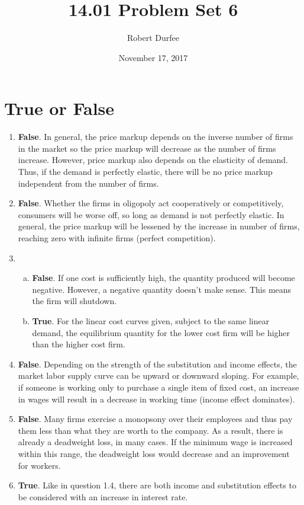 \documentclass{article}
\title{ 14.01 Problem Set 6 }
\author{ Robert Durfee }
\date{ November 17, 2017 }
\begin{document}
\maketitle

\section{ True or False }

\begin{enumerate}
    \item \textbf{False}. In general, the price markup depends on the inverse
        number of firms in the market so the price markup will decrease as the
        number of firms increase. However, price markup also depends on the
        elasticity of demand. Thus, if the demand is perfectly elastic, there
        will be no price markup independent from the number of firms.
    \item \textbf{False}. Whether the firms in oligopoly act cooperatively or
        competitively, consumers will be worse off, so long as demand is not
        perfectly elastic. In general, the price markup will be lessened by the
        increase in number of firms, reaching zero with infinite firms (perfect
        competition).     
    \item 
        \begin{enumerate}[a.]
            \item \textbf{False}. If one cost is sufficiently high, the quantity
                produced will become negative. However, a negative quantity
                doesn't make sense. This means the firm will shutdown.
            \item \textbf{True}. For the linear cost curves given, subject to
                the same linear demand, the equilibrium quantity for the lower
                cost firm will be higher than the higher cost firm.
        \end{enumerate}
    \item \textbf{False}. Depending on the strength of the substitution and
        income effects, the market labor supply curve can be upward or downward
        sloping. For example, if someone is working only to purchase a single
        item of fixed cost, an increase in wages will result in a decrease in
        working time (income effect dominates).
    \item \textbf{False}. Many firms exercise a monopsony over their employees
        and thus pay them less than what they are worth to the company. As a
        result, there is already a deadweight loss, in many cases. If the
        minimum wage is increased within this range, the deadweight loss would
        decrease and an improvement for workers.
    \item \textbf{True}. Like in question 1.4, there are both income and
        substitution effects to be considered with an increase in interest
        rate. 
\end{enumerate}
\end{document}
